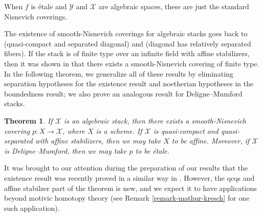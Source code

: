 \documentclass[10pt]{amsart}
\theoremstyle{plain}
\newtheorem{theorem}[thm]{Theorem}
\theoremstyle{definition}
\newcommand{\sX}{{\mathcal X}}
\newcommand{\sY}{{\mathcal Y}}
\begin{document}
When $f$ is \'{e}tale and $\sY$ and $\sX$ are algebraic spaces, these
are just the standard Nisnevich coverings.

The existence of smooth-Nisnevich coverings for algebraic stacks goes back to
\cite[\S6]{LMB} (quasi-compact and separated diagonal) and
\cite[Appendix B]{cesnavicius15} (diagonal has relatively separated
fibers). If the stack is of finite type over an infinite field with
affine stabilizers, then it was shown in \cite{pirisi2018} that there
exists a smooth-Nisnevich covering of finite type. In the following theorem, we generalize all of these results by
eliminating separation hypotheses for the existence result and
noetherian hypotheses in the boundedness result; we also prove an
analogous result for Deligne--Mumford stacks. 

\begin{theorem}\label{MT}
	If $\mathcal{X}$ is an algebraic stack, then there exists a
	smooth-Nisnevich covering $p\colon X \to \mathcal{X}$, where $X$ is
	a scheme. If $\mathcal{X}$ is quasi-compact and quasi-separated with
	affine stabilizers, then we may take $X$ to be affine. Moreover, if
	$\mathcal{X}$ is Deligne--Mumford, then we may take $p$ to be
	\'etale.
\end{theorem}



It
was brought to our attention during the preparation of our results
that the existence result was recently proved in a similar way in
\cite{chowdhury2024nonrepresentablesixfunctorformalisms}. However, the qcqs and affine stabilzer part of the theorem is new, and we expect it to have applications beyond motivic homotopy theory (see Remark \ref{remark-mathur-kresch} for one such application).


\end{document}
